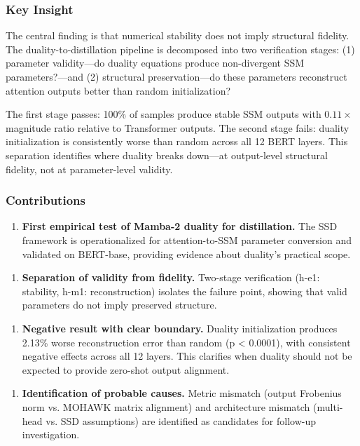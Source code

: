\subsubsection{Key Insight}

The central finding is that numerical stability does not imply structural fidelity. The duality-to-distillation pipeline is decomposed into two verification stages: (1) parameter validity---do duality equations produce non-divergent SSM parameters?---and (2) structural preservation---do these parameters reconstruct attention outputs better than random initialization?

The first stage passes: 100\% of samples produce stable SSM outputs with 0.$11\times$ magnitude ratio relative to Transformer outputs. The second stage fails: duality initialization is consistently worse than random across all 12 BERT layers. This separation identifies where duality breaks down---at output-level structural fidelity, not at parameter-level validity.

\subsubsection{Contributions}

\begin{enumerate}
\item \textbf{First empirical test of Mamba-2 duality for distillation.} The SSD framework is operationalized for attention-to-SSM parameter conversion and validated on BERT-base, providing evidence about duality's practical scope.
\end{enumerate}

\begin{enumerate}
\item \textbf{Separation of validity from fidelity.} Two-stage verification (h-e1: stability, h-m1: reconstruction) isolates the failure point, showing that valid parameters do not imply preserved structure.
\end{enumerate}

\begin{enumerate}
\item \textbf{Negative result with clear boundary.} Duality initialization produces 2.13\% worse reconstruction error than random (p < 0.0001), with consistent negative effects across all 12 layers. This clarifies when duality should not be expected to provide zero-shot output alignment.
\end{enumerate}

\begin{enumerate}
\item \textbf{Identification of probable causes.} Metric mismatch (output Frobenius norm vs. MOHAWK matrix alignment) and architecture mismatch (multi-head vs. SSD assumptions) are identified as candidates for follow-up investigation.
\end{enumerate}
